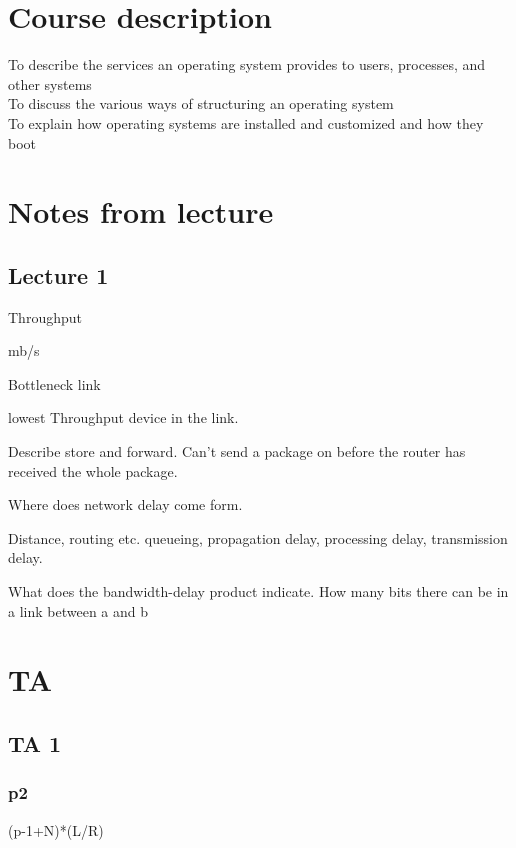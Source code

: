 \documentclass[a4paper,10pt,titlepage]{report}
\date{}
\begin{document}
\renewcommand{\thepage}{\roman{page}}%
\tableofcontents
\newpage
\setcounter{page}{1}
\renewcommand{\thepage}{\arabic{page}}
\section{Course description}
To describe the services an operating system provides to
users, processes, and other systems\\
To discuss the various ways of structuring an operating
system\\
To explain how operating systems are installed and
customized and how they boot\\
\newpage

\section{Notes from lecture}



\subsection{Lecture 1}
Throughput

mb/s

Bottleneck link

lowest Throughput device in the link.

Describe store and forward.
Can't send a package on before the router has received the whole package.

Where does network delay come form.

Distance, routing etc.
queueing, propagation delay, processing delay, transmission delay.

What does the bandwidth-delay product indicate.
How many bits there can be in a link between a and b





\section{TA}
\subsection{TA 1}
\subsubsection{p2}
(p-1+N)*(L/R)
\end{document}
